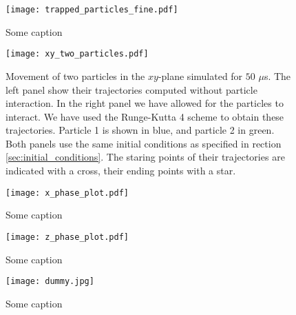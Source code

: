 \begin{figure}[h!]
    \texttt{[image: trapped\_particles\_fine.pdf]}
    \caption{Some caption}
    \label{fig:trapped_with}
\end{figure}



\newpage
\onecolumngrid


\begin{figure}[h!]
    \texttt{[image: xy\_two\_particles.pdf]}
    \caption{Movement of two particles in the $xy$-plane simulated for $50$ $\mu$s. The left panel show their trajectories computed without particle interaction. In the right panel we have allowed for the particles to interact. We have used the Runge-Kutta 4 scheme to obtain these trajectories. Particle 1 is shown in blue, and particle 2 in green. Both panels use the same initial conditions as specified in rection \ref{sec:initial_conditions}. The staring points of their trajectories are indicated with a cross, their ending points with a star. }
    \label{fig:xy_two_particles}
\end{figure}

\begin{figure}[h!]
    \texttt{[image: x\_phase\_plot.pdf]}
    \caption{Some caption}
    \label{fig:x_phase_two_particles}
\end{figure}

\begin{figure}[h!]
    \texttt{[image: z\_phase\_plot.pdf]}
    \caption{Some caption}
    \label{fig:z_phase_two_particles}
\end{figure}

\begin{figure}[h!]
    \texttt{[image: dummy.jpg]}
    \caption{Some caption}
    \label{fig:some_ref} 
\end{figure}



 
\twocolumngrid
 





